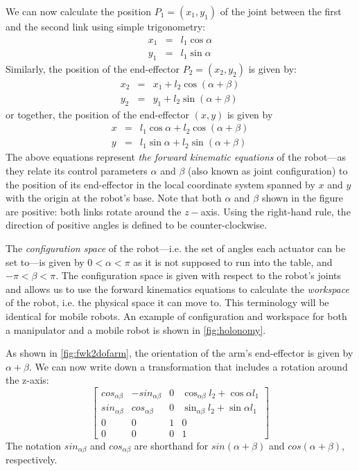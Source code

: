 We can now calculate the position $P_1 = (x_1, y_1)$ of the joint between the first and the second link using simple trigonometry:
%
\begin{eqnarray}\label{eq:cosxl1}
x_1 &=&l_1 \cos \alpha \nonumber \\
y_1 &=&l_1 \sin \alpha
\end{eqnarray}
%
Similarly, the position of the end-effector $P_2 = (x_2, y_2)$ is given by:
%
\begin{eqnarray}
x_2&=&x_1 + l_2 \cos(\alpha+\beta) \nonumber \\
y_2&=&y_1 + l_2 \sin(\alpha+\beta)
\end{eqnarray}
%
or together, the position of the end-effector $(x,y)$ is given by
%
\begin{eqnarray}\label{eq:cosx}
x&=&l_1 \cos \alpha + l_2 \cos(\alpha+\beta) \nonumber \\
y&=&l_1 \sin \alpha + l_2 \sin(\alpha+\beta)
\end{eqnarray}
%
The above equations represent \textsl{the forward kinematic equations} of the robot---as they relate its control parameters $ \alpha$ and $\beta$ (also known as joint configuration) to the position of its end-effector in the local coordinate system spanned by $ x$ and $ y$ with the origin at the robot's base.
Note that both $\alpha$ and $\beta$ shown in the figure are positive: both links rotate around the $z-$axis. Using the right-hand rule, the direction of positive angles is defined to be counter-clockwise.

The \emph{configuration space} of the robot---i.e. the set of angles each actuator can be set to---is given by $ 0 < \alpha < \pi $ as it is not supposed to run into the table, and $ -\pi < \beta < \pi$.
The configuration space is given with respect to the robot's joints and allows us to use the forward kinematics equations to calculate the \emph{workspace} of the robot, i.e. the physical space it can move to.
This terminology will be identical for mobile robots. An example of configuration and workspace for both a manipulator and a mobile robot is shown in \cref{fig:holonomy}.

As shown in \cref{fig:fwk2dofarm}, the orientation of the arm's end-effector is given by $\alpha+\beta$. We can now write down  a transformation that includes a rotation around the z-axis:
\begin{equation}
\label{eq:2armtrans}
\left[\begin{array}{cccc}cos_{\alpha\beta} & -sin_{\alpha\beta} &  0 & \cos_{\alpha\beta}l_2+\cos\alpha l_1\\
                        sin_{\alpha\beta} & cos_{\alpha\beta} & 0 & \sin_{\alpha\beta}l_2+\sin\alpha l_1\\
                                                0 & 0 & 1 & 0\\
                                                0 & 0 & 0 & 1\end{array}\right]
\end{equation}
The notation $sin_{\alpha\beta}$ and $cos_{\alpha\beta}$ are shorthand for $sin(\alpha+\beta)$ and $cos(\alpha+\beta)$, respectively.


